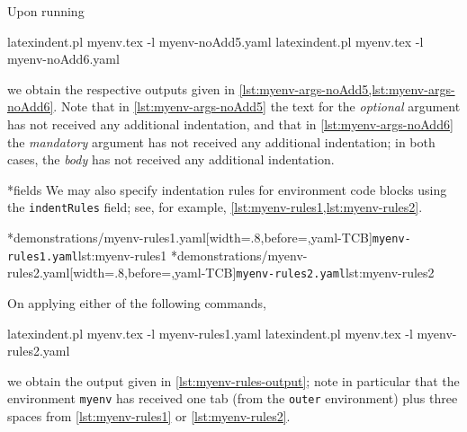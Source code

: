 	Upon running
	\begin{commandshell}
latexindent.pl myenv.tex -l myenv-noAdd5.yaml  
latexindent.pl myenv.tex -l myenv-noAdd6.yaml  
\end{commandshell}
	we obtain the respective outputs given in
	\cref{lst:myenv-args-noAdd5,lst:myenv-args-noAdd6}. Note that in
	\cref{lst:myenv-args-noAdd5} the text for the \emph{optional} argument has not received
	any additional indentation, and that in \cref{lst:myenv-args-noAdd6} the \emph{mandatory}
	argument has not received any additional indentation; in both cases, the \emph{body} has
	not received any additional indentation.

	\begin{minipage}{.45\textwidth}
	\end{minipage}
	\hfill
	\begin{minipage}{.45\textwidth}
	\end{minipage}

*{fields}
	We may also specify indentation rules for environment code blocks using the
	\texttt{indentRules} field; see, for example, \cref{lst:myenv-rules1,lst:myenv-rules2}.

	\begin{cmhtcbraster}[raster column skip=.1\linewidth]
		\cmhlistingsfromfile[style=yaml-LST]*{demonstrations/myenv-rules1.yaml}[width=.8\linewidth,before=\centering,yaml-TCB]{\texttt{myenv-rules1.yaml}}{lst:myenv-rules1}
		\cmhlistingsfromfile[style=yaml-LST]*{demonstrations/myenv-rules2.yaml}[width=.8\linewidth,before=\centering,yaml-TCB]{\texttt{myenv-rules2.yaml}}{lst:myenv-rules2}
	\end{cmhtcbraster}

	On applying either of the following commands,
	\begin{commandshell}
latexindent.pl myenv.tex -l myenv-rules1.yaml  
latexindent.pl myenv.tex -l myenv-rules2.yaml  
\end{commandshell}
	we obtain the output given in \cref{lst:myenv-rules-output}; note in particular that the
	environment \texttt{myenv} has received one tab (from the \texttt{outer} environment)
	plus three spaces from \cref{lst:myenv-rules1} or \ref{lst:myenv-rules2}.

